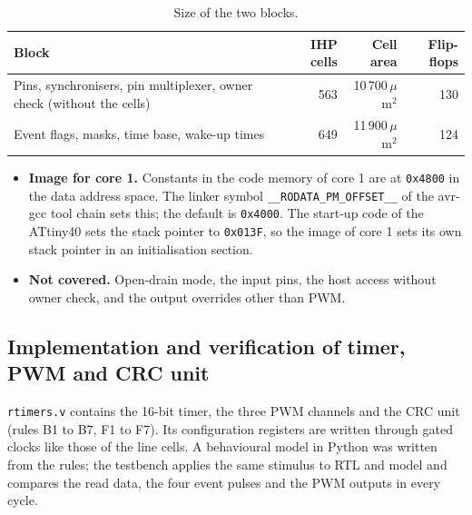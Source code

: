 \documentclass[10pt,a4paper]{article}
\begin{document}
\begin{table}[H]
\centering\small
\begin{tabular}{@{}lrrr@{}}
\toprule
Block & IHP cells & Cell area & Flip-flops \\
\midrule
Pins, synchronisers, pin multiplexer, owner check (without the cells) & 563 & 10\,700\,$\mu$m$^2$ & 130 \\
Event flags, masks, time base, wake-up times & 649 & 11\,900\,$\mu$m$^2$ & 124 \\
\bottomrule
\end{tabular}
\caption{Size of the two blocks.}
\end{table}

\begin{itemize}
\item \textbf{Image for core 1.} Constants in the code memory of core 1 are at \texttt{0x4800} in the data
address space. The linker symbol \texttt{\_\_RODATA\_PM\_OFFSET\_\_} of the avr-gcc tool chain sets this; the
default is \texttt{0x4000}. The start-up code of the ATtiny40 sets the stack pointer to \texttt{0x013F}, so
the image of core 1 sets its own stack pointer in an initialisation section.
\item \textbf{Not covered.} Open-drain mode, the input pins, the host access without owner check, and the
output overrides other than PWM.
\end{itemize}

\subsection{Implementation and verification of timer, PWM and CRC unit}\label{sec:timver}

\texttt{rtimers.v} contains the 16-bit timer, the three PWM channels and the CRC unit (rules B1 to B7, F1 to
F7). Its configuration registers are written through gated clocks like those of the line cells. A behavioural
model in Python was written from the rules; the testbench applies the same stimulus to RTL and model and
compares the read data, the four event pulses and the PWM outputs in every cycle.
\end{document}
